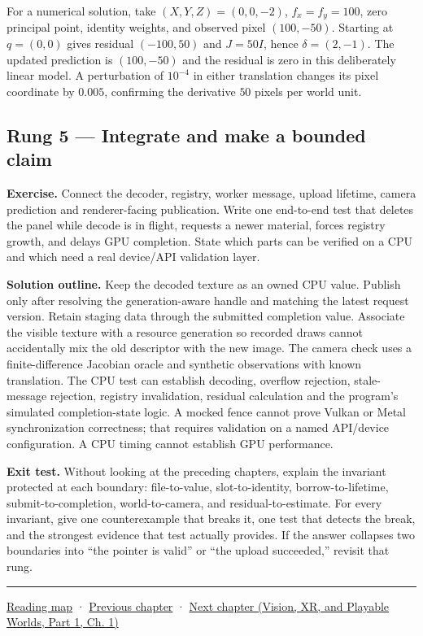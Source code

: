 For a numerical solution, take \((X,Y,Z)=(0,0,-2)\), \(f_x=f_y=100\), zero principal point, identity weights, and observed pixel \((100,-50)\). Starting at \(q=(0,0)\) gives residual \((-100,50)\) and \(J=50I\), hence \(\delta=(2,-1)\). The updated prediction is \((100,-50)\) and the residual is zero in this deliberately linear model. A perturbation of \(10^{-4}\) in either translation changes its pixel coordinate by \(0.005\), confirming the derivative \(50\) pixels per world unit.

\subsection{Rung 5 --- Integrate and make a bounded claim}\label{02-foundations-ii-ch038-rung-5-integrate-and-make-a-bounded-claim}

\hypertarget{02-foundations-ii-ch038-rung-5-integrate-and-make-a-bounded-claim}{}

\textbf{Exercise.} Connect the decoder, registry, worker message, upload lifetime, camera prediction and renderer-facing publication. Write one end-to-end test that deletes the panel while decode is in flight, requests a newer material, forces registry growth, and delays GPU completion. State which parts can be verified on a CPU and which need a real device/API validation layer.

\textbf{Solution outline.} Keep the decoded texture as an owned CPU value. Publish only after resolving the generation-aware handle and matching the latest request version. Retain staging data through the submitted completion value. Associate the visible texture with a resource generation so recorded draws cannot accidentally mix the old descriptor with the new image. The camera check uses a finite-difference Jacobian oracle and synthetic observations with known translation. The CPU test can establish decoding, overflow rejection, stale-message rejection, registry invalidation, residual calculation and the program's simulated completion-state logic. A mocked fence cannot prove Vulkan or Metal synchronization correctness; that requires validation on a named API/device configuration. A CPU timing cannot establish GPU performance.

\textbf{Exit test.} Without looking at the preceding chapters, explain the invariant protected at each boundary: file-to-value, slot-to-identity, borrow-to-lifetime, submit-to-completion, world-to-camera, and residual-to-estimate. For every invariant, give one counterexample that breaks it, one test that detects the break, and the strongest evidence that test actually provides. If the answer collapses two boundaries into ``the pointer is valid'' or ``the upload succeeded,'' revisit that rung.

\begin{center}\rule{0.5\linewidth}{0.5pt}\end{center}

\hyperref[volume-reading-map]{Reading map} · \hyperref[02-foundations-ii-ch037-camera-contracts-and-transform-chain-debugging]{Previous chapter} · \href{../07-Vision-XR-and-Playable-Worlds-P01/main.pdf\#nameddest=02-foundations-ii-ch039-research-navigation-and-source-boundaries}{Next chapter (Vision, XR, and Playable Worlds, Part 1, Ch. 1)}
